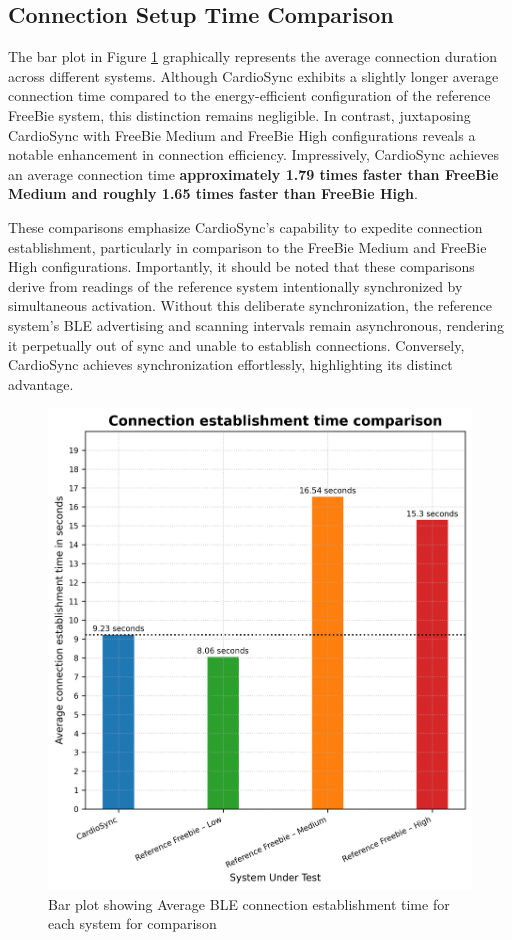 \subsection{Connection Setup Time Comparison}
The bar plot in Figure \ref{fig:conn_time_comp} graphically represents the average connection duration across different systems. Although CardioSync exhibits a slightly longer average connection time compared to the energy-efficient configuration of the reference FreeBie system, this distinction remains negligible. In contrast, juxtaposing CardioSync with FreeBie Medium and FreeBie High configurations reveals a notable enhancement in connection efficiency. Impressively, CardioSync achieves an average connection time \textbf{approximately 1.79 times faster than FreeBie Medium and roughly 1.65 times faster than FreeBie High}.

\noindent These comparisons emphasize CardioSync's capability to expedite connection establishment, particularly in comparison to the FreeBie Medium and FreeBie High configurations. Importantly, it should be noted that these comparisons derive from readings of the reference system intentionally synchronized by simultaneous activation. Without this deliberate synchronization, the reference system's BLE advertising and scanning intervals remain asynchronous, rendering it perpetually out of sync and unable to establish connections. Conversely, CardioSync achieves synchronization effortlessly, highlighting its distinct advantage.

\begin{figure}[H]
    \centering
    \includegraphics[width=0.8\linewidth]{chapters/Results/Connection_time_comparison.png}
    \caption{Bar plot showing Average BLE connection establishment time for each system for comparison}
    \label{fig:conn_time_comp}
\end{figure}


